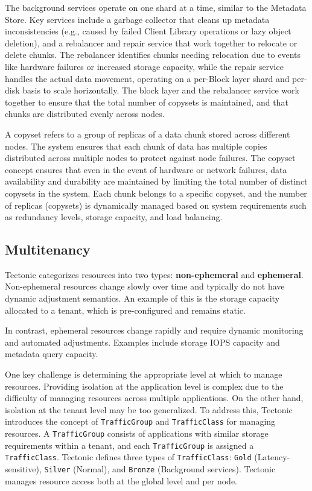 The background services operate on one shard at a time, similar to the Metadata Store. Key services include a garbage collector that cleans up metadata inconsistencies (e.g., caused by failed Client Library operations or lazy object deletion), and a rebalancer and repair service that work together to relocate or delete chunks. The rebalancer identifies chunks needing relocation due to events like hardware failures or increased storage capacity, while the repair service handles the actual data movement, operating on a per-Block layer shard and per-disk basis to scale horizontally. The block layer and the rebalancer service work together to ensure that the total number of copysets\cite{copyset} is maintained, and that chunks are distributed evenly across nodes. 

A copyset refers to a group of replicas of a data chunk stored across different nodes. The system ensures that each chunk of data has multiple copies distributed across multiple nodes to protect against node failures. The copyset concept ensures that even in the event of hardware or network failures, data availability and durability are maintained by limiting the total number of distinct copysets in the system. Each chunk belongs to a specific copyset, and the number of replicas (copysets) is dynamically managed based on system requirements such as redundancy levels, storage capacity, and load balancing.


\subsection{Multitenancy}\label{sec:multitenancy}

Tectonic categorizes resources into two types: \textbf{non-ephemeral} and \textbf{ephemeral}. Non-ephemeral resources change slowly over time and typically do not have dynamic adjustment semantics. An example of this is the storage capacity allocated to a tenant, which is pre-configured and remains static.

In contrast, ephemeral resources change rapidly and require dynamic monitoring and automated adjustments. Examples include storage IOPS capacity and metadata query capacity.

One key challenge is determining the appropriate level at which to manage resources. Providing isolation at the application level is complex due to the difficulty of managing resources across multiple applications. On the other hand, isolation at the tenant level may be too generalized. To address this, Tectonic introduces the concept of \texttt{TrafficGroup} and \texttt{TrafficClass} for managing resources. A \texttt{TrafficGroup} consists of applications with similar storage requirements within a tenant, and each \texttt{TrafficGroup} is assigned a \texttt{TrafficClass}. Tectonic defines three types of \texttt{TrafficClass}: \texttt{Gold} (Latency-sensitive), \texttt{Silver} (Normal), and \texttt{Bronze} (Background services). Tectonic manages resource access both at the global level and per node.

